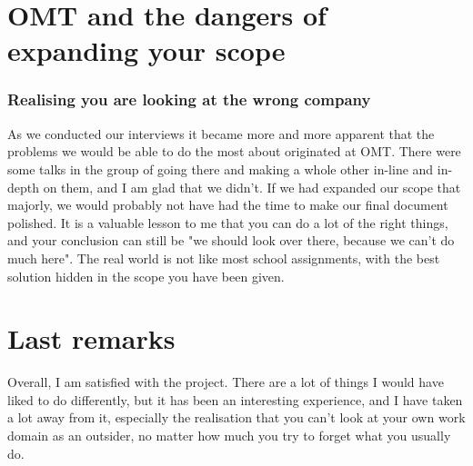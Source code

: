 
\section*{OMT and the dangers of expanding your scope}
\subsubsection{Realising you are looking at the wrong company}
As we conducted our interviews it became more and more apparent that the problems we would be able to do the most about originated at OMT. There were some talks in the group of going there and making a whole other in-line and in-depth on them, and I am glad that we didn't. If we had expanded our scope that majorly, we would probably not have had the time to make our final document polished. 
It is a valuable lesson to me that you can do a lot of the right things, and your conclusion can still be "we should look over there, because we can't do much here". The real world is not like most school assignments, with the best solution hidden in the scope you have been given. 

\section*{Last remarks}
Overall, I am satisfied with the project. There are a lot of things I would have liked to do differently, but it has been an interesting experience, and I have taken a lot away from it, especially the realisation that you can't look at your own work domain as an outsider, no matter how much you try to forget what you usually do.